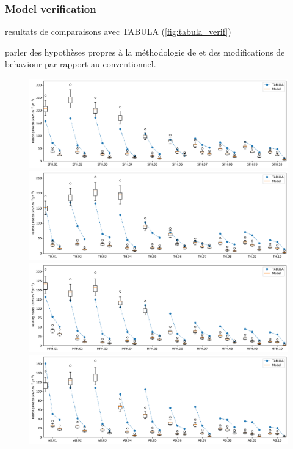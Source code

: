 \documentclass[11pt]{article}
\begin{document}
        

        \subsubsection{Model verification} %
        \label{ssub:model_verification}
        
        resultats de comparaisons avec TABULA (\ref{fig:tabula_verif})

        parler des hypothèses propres à la méthodologie de \textcite{pouget_consultants_batiments_2015} et des modifications de behaviour par rapport au conventionnel. 

        \begin{figure}[ht]
            \centering
            \includegraphics[width=0.99\columnwidth]{figures/SFH_TABULA_consumption.png}
            \includegraphics[width=0.99\columnwidth]{figures/TH_TABULA_consumption.png}
            \includegraphics[width=0.99\columnwidth]{figures/MFH_TABULA_consumption.png}
            \includegraphics[width=0.99\columnwidth]{figures/AB_TABULA_consumption.png}

\end{figure}
\end{document}
